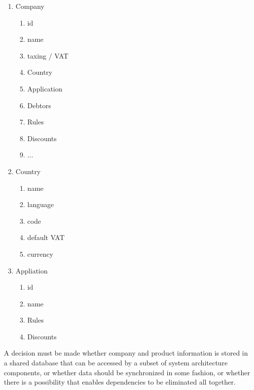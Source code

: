 \begin{multicols}{2}
\begin{enumerate}
	\item Company
	      \begin{enumerate}
		      \item id
		      \item name
		      \item taxing / VAT
		      \item Country
		      \item Application
		      \item Debtors
		      \item Rules
		      \item Discounts
		      \item ...
	      \end{enumerate}
	\item Country
	      \begin{enumerate}
		      \item name
		      \item language
		      \item code
		      \item default VAT
		      \item currency
	      \end{enumerate}
	\item Appliation
	      \begin{enumerate}
		      \item id
		      \item name
		      \item Rules
		      \item Discounts
	      \end{enumerate}
\end{enumerate}
\end{multicols}

A decision must be made whether company and product information is stored in a shared database that can be accessed by a subset of system architecture components, or whether data should be synchronized in some fashion, or whether there is a possibility that enables dependencies to be eliminated all together.

%
